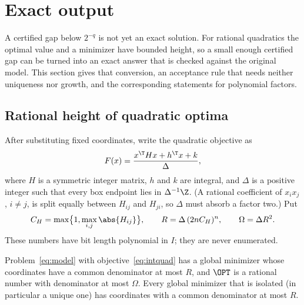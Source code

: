 \section{Exact output}\label{sec:exact}

A certified gap below $2^{-q}$ is not yet an exact solution. For rational
quadratics the optimal value and a minimizer have bounded height, so a
small enough certified gap can be turned into an exact answer that is
checked against the original model. This section gives that conversion,
an acceptance rule that needs neither uniqueness nor growth, and the
corresponding statements for polynomial factors.

\subsection{Rational height of quadratic optima}
After substituting fixed coordinates, write the quadratic objective as
\begin{equation}\label{eq:intquad}
F(x)=\frac{x^\T Hx+h^\T x+k}{\Delta},
\end{equation}
where $H$ is a symmetric integer matrix, $h$ and $k$ are integral, and
$\Delta$ is a positive integer such that every box endpoint lies in
$\Delta^{-1}\Z$. (A rational coefficient of $x_ix_j$, $i\ne j$, is split
equally between $H_{ij}$ and $H_{ji}$, so $\Delta$ must absorb a factor
two.) Put
\begin{equation}\label{eq:height}
C_H=\max\bigl\{1,\max_{i,j}\abs{H_{ij}}\bigr\},\qquad
R=\Delta\,(2nC_H)^n,\qquad \Omega=\Delta R^2 .
\end{equation}
These numbers have bit length polynomial in $I$; they are never
enumerated.

\begin{lemma}\label{lem:height}
Problem~\eqref{eq:model} with objective~\eqref{eq:intquad} has a global
minimizer whose coordinates have a common denominator at most $R$, and
$\OPT$ is a rational number with denominator at most $\Omega$. Every global
minimizer that is isolated (in particular a unique one) has coordinates
with a common denominator at most $R$.
\end{lemma}

